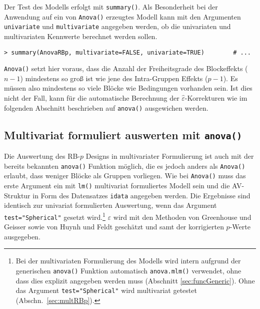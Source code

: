 Der Test des Modells erfolgt mit \lstinline!summary()!. Als Besonderheit bei der Anwendung auf ein von \lstinline!Anova()! erzeugtes Modell kann mit den Argumenten \lstinline!univariate! und \lstinline!multivariate! angegeben werden, ob die univariaten und multivariaten Kennwerte berechnet werden sollen.
\begin{lstlisting}
> summary(AnovaRBp, multivariate=FALSE, univariate=TRUE)        # ...
\end{lstlisting}

\lstinline!Anova()! setzt hier voraus, dass die Anzahl der Freiheitsgrade des Blockeffekts ($n-1$) mindestens so groß ist wie jene des Intra-Gruppen Effekts ($p-1$). Es müssen also mindestens so viele Blöcke wie Bedingungen vorhanden sein. Ist dies nicht der Fall, kann für die automatische Berechnung der $\hat{\varepsilon}$-Korrekturen wie im folgenden Abschnitt beschrieben auf \lstinline!anova()! ausgewichen werden.

\subsection{Multivariat formuliert auswerten mit \texttt{anova()}}
\label{sec:RBpMX}

Die Auswertung des RB-$p$ Designs in multivariater Formulierung ist auch mit der bereits bekannten \lstinline!anova()! Funktion möglich, die es jedoch anders als \lstinline!Anova()! erlaubt, dass weniger Blöcke als Gruppen vorliegen. Wie bei \lstinline!Anova()! muss das erste Argument ein mit \lstinline!lm()! multivariat formuliertes Modell sein und die AV-Struktur in Form des Datensatzes \lstinline!idata! angegeben werden. Die Ergebnisse sind identisch zur univariat formulierten Auswertung, wenn das Argument \lstinline!test="Spherical"! gesetzt wird.\footnote{\label{ftn:spherical}Bei der multivariaten Formulierung des Modells wird intern aufgrund der generischen \lstinline!anova()! Funktion automatisch \lstinline!anova.mlm()! verwendet, ohne dass dies explizit angegeben werden muss (Abschnitt \ref{sec:funcGeneric}). Ohne das Argument \lstinline!test="Spherical"! wird multivariat getestet (Abschn.\ \ref{sec:multRBp}).} $\varepsilon$ wird mit den Methoden von Greenhouse und Geisser sowie von Huynh und Feldt geschätzt und samt der korrigierten $p$-Werte ausgegeben.

